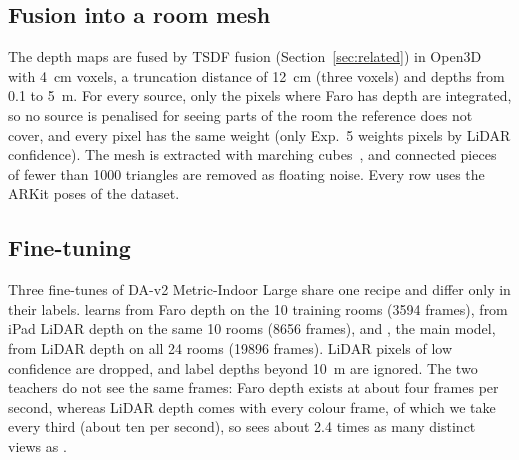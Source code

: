 \subsection{Fusion into a room mesh}\label{sec:fusion}
The depth maps are fused by TSDF fusion (Section~\ref{sec:related}) in Open3D~\cite{open3d} with \SI{4}{cm} voxels,
a truncation distance of \SI{12}{cm} (three voxels) and depths from 0.1 to \SI{5}{m}. For every source, only the
pixels where Faro has depth are integrated, so no source is penalised for seeing parts of the room the reference does
not cover, and every pixel has the same weight (only Exp.~5 weights pixels by LiDAR confidence). The mesh is
extracted with marching cubes~\cite{marchingcubes}, and connected pieces of fewer than \num{1000} triangles are removed
as floating noise. Every row uses the ARKit poses of the dataset.

\subsection{Fine-tuning}\label{sec:ftsetup}
Three fine-tunes of DA-v2 Metric-Indoor Large share one recipe and differ only in their labels. \ftfaro{} learns from
Faro depth on the 10 training rooms (\num{3594} frames), \ftlidar{} from iPad LiDAR depth on the same 10 rooms
(\num{8656} frames), and \ftmain{}, the main model, from LiDAR depth on all 24 rooms (\num{19896} frames). LiDAR pixels
of low confidence are dropped, and label depths beyond \SI{10}{m} are ignored. The two teachers do not see the same
frames: Faro depth exists at about four frames per second, whereas LiDAR depth comes with every colour frame, of which
we take every third (about ten per second), so \ftlidar{} sees about 2.4 times as many distinct views as \ftfaro{}.

